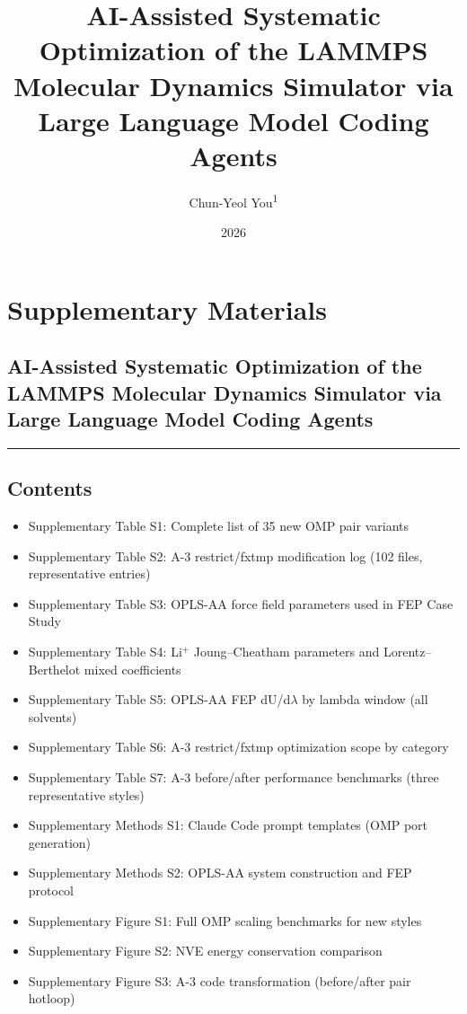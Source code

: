 \documentclass[
  11pt,
]{article}
\title{AI-Assisted Systematic Optimization of the LAMMPS Molecular
Dynamics Simulator via Large Language Model Coding Agents}
\author{Chun-Yeol You\textsuperscript{1}}
\date{2026}
\providecommand{\tightlist}{%
  \setlength{\itemsep}{0pt}\setlength{\parskip}{0pt}}
\begin{document}
\maketitle

\section{Supplementary Materials}\label{supplementary-materials}

\subsection{AI-Assisted Systematic Optimization of the LAMMPS Molecular
Dynamics Simulator via Large Language Model Coding
Agents}\label{ai-assisted-systematic-optimization-of-the-lammps-molecular-dynamics-simulator-via-large-language-model-coding-agents}

\begin{center}\rule{0.5\linewidth}{0.5pt}\end{center}

\subsection{Contents}\label{contents}

\begin{itemize}
\tightlist
\item
  Supplementary Table S1: Complete list of 35 new OMP pair variants
\item
  Supplementary Table S2: A-3 restrict/fxtmp modification log (102
  files, representative entries)
\item
  Supplementary Table S3: OPLS-AA force field parameters used in FEP
  Case Study
\item
  Supplementary Table S4: Li\(^{+}\) Joung--Cheatham parameters and
  Lorentz--Berthelot mixed coefficients
\item
  Supplementary Table S5: OPLS-AA FEP dU/d\(\lambda\) by lambda window
  (all solvents)
\item
  Supplementary Table S6: A-3 restrict/fxtmp optimization scope by
  category
\item
  Supplementary Table S7: A-3 before/after performance benchmarks (three
  representative styles)
\item
  Supplementary Methods S1: Claude Code prompt templates (OMP port
  generation)
\item
  Supplementary Methods S2: OPLS-AA system construction and FEP protocol
\item
  Supplementary Figure S1: Full OMP scaling benchmarks for new styles
\item
  Supplementary Figure S2: NVE energy conservation comparison
\item
  Supplementary Figure S3: A-3 code transformation (before/after pair
  hotloop)
\end{itemize}
\end{document}
